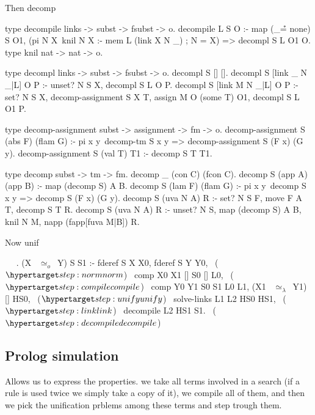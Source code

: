 \documentclass[sigconf,natbib=false,review]{acmart}
\newcommand{\UnifRel}{\ensuremath{\simeq}}
\newcommand{\Uo}{\ensuremath{\UnifRel_o}\xspace}
\newcommand{\Ue}{\ensuremath{\UnifRel_\lambda}\xspace}
\begin{document}
Then decomp

\begin{elpicode}
type decompile links -> subst -> fsubst -> o.
decompile L S O :-
  map (_\r\r = none) S O1, %
  (pi N X\ knil N X :- mem L (link X N _) ; N = X) =>
    decompl S L O1 O.
type knil nat -> nat -> o.

type decompl links -> subst -> fsubst -> o.
decompl S [] [].
decompl S [link _ N _|L] O P :- unset? N S X,
  decompl S L O P.
decompl S [link M N _|L] O P :- set? N S X,
  decomp-assignment S X T, assign M O (some T) O1,
  decompl S L O1 P.

type decomp-assignment subst -> assignment -> fm -> o.
decomp-assignment S (abs F) (flam G) :-
  pi x y\ decomp-tm S x y => decomp-assignment S (F x) (G y).
decomp-assignment S (val T) T1 :- decomp S T T1.

type decomp subst -> tm -> fm.
decomp _ (con C) (fcon C).
decomp S (app A) (app B) :- map (decomp S) A B.
decomp S (lam F) (flam G) :-
  pi x y\ decomp S x y => decomp S (F x) (G y).
decomp S (uva N A) R :- set? N S F,
  move F A T, decomp S T R.
decomp S (uva N A) R :- unset? N S,
  map (decomp S) A B, knil N M, napp (fapp[fuva M|B]) R.
\end{elpicode}
  

Now unif

\begin{elpicode}
~ \PYG{n+nf}{(\Uo)} ~.
(X ~\Uo~Y) S S1 :-
  fderef S X X0, fderef S Y Y0,                    ~($\customlabel{step:norm}{norm}$)~
  comp X0 X1 [] S0 [] L0,                        ~($\customlabel{step:compile}{compile}$)~
  comp Y0 Y1 S0 S1 L0 L1,
  (X1 ~\Ue~Y1) [] HS0,                              ~($\customlabel{step:unify}{unify}$)~
  solve-links L1 L2 HS0 HS1,                        ~($\customlabel{step:link}{link}$)~
  decompile L2 HS1  S1.                        ~($\customlabel{step:decompile}{decompile}$)~
\end{elpicode}

\subsection{Prolog simulation}
Allows us to express the properties.
we take all terms involved in a search (if a rule is used twice we simply
take a copy of it), we compile all of them, and then we pick the unification
prblems among these terms and step trough them.
\end{document}

